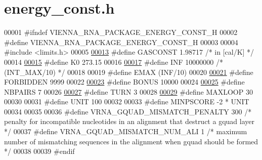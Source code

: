 \hypertarget{energy__const_8h_source}{}\section{energy\+\_\+const.\+h}
\label{energy__const_8h_source}

\begin{DoxyCode}
00001 \textcolor{preprocessor}{#ifndef VIENNA\_RNA\_PACKAGE\_ENERGY\_CONST\_H}
00002 \textcolor{preprocessor}{#define VIENNA\_RNA\_PACKAGE\_ENERGY\_CONST\_H}
00003 
00004 \textcolor{preprocessor}{#include <limits.h>}
00005 
\hyperlink{energy__const_8h_ab1e4a8d82f24ed5db01dde5f25269cf1}{00013} \textcolor{preprocessor}{#define GASCONST 1.98717  }\textcolor{comment}{/* in [cal/K] */}\textcolor{preprocessor}{}
00014 
\hyperlink{energy__const_8h_a307c72605e3713972b4f4fb2d53ea20e}{00015} \textcolor{preprocessor}{#define K0  273.15}
00016 
\hyperlink{energy__const_8h_a12c2040f25d8e3a7b9e1c2024c618cb6}{00017} \textcolor{preprocessor}{#define INF 10000000 }\textcolor{comment}{/* (INT\_MAX/10) */}\textcolor{preprocessor}{}
00018 
00019 \textcolor{preprocessor}{#define EMAX (INF/10)}
00020 
\hyperlink{energy__const_8h_a5064c29ab2d1e20c2304b3c67562774d}{00021} \textcolor{preprocessor}{#define FORBIDDEN 9999}
00022 
\hyperlink{energy__const_8h_a96a9822fa134450197dd454b1478a193}{00023} \textcolor{preprocessor}{#define BONUS 10000}
00024 
\hyperlink{energy__const_8h_a5e75221c779d618eab81e096f37e32ce}{00025} \textcolor{preprocessor}{#define NBPAIRS 7}
00026 
\hyperlink{energy__const_8h_ae646250fd59311356c7e5722a81c3a96}{00027} \textcolor{preprocessor}{#define TURN 3}
00028 
\hyperlink{energy__const_8h_ad1bd6eabac419670ddd3c9ed82145988}{00029} \textcolor{preprocessor}{#define MAXLOOP 30}
00030 
00031 \textcolor{preprocessor}{#define UNIT 100}
00032 
00033 \textcolor{preprocessor}{#define MINPSCORE -2 * UNIT}
00034 
00035 
00036 \textcolor{preprocessor}{#define   VRNA\_GQUAD\_MISMATCH\_PENALTY   300   }\textcolor{comment}{/* penalty for incompatible nucleotides in an alignment that
       destruct a gquad layer */}\textcolor{preprocessor}{}
00037 \textcolor{preprocessor}{#define   VRNA\_GQUAD\_MISMATCH\_NUM\_ALI   1   }\textcolor{comment}{/* maximum number of mismatching sequences in the alignment
       when gquad should be formed */}\textcolor{preprocessor}{}
00038 
00039 \textcolor{preprocessor}{#endif}
\end{DoxyCode}
